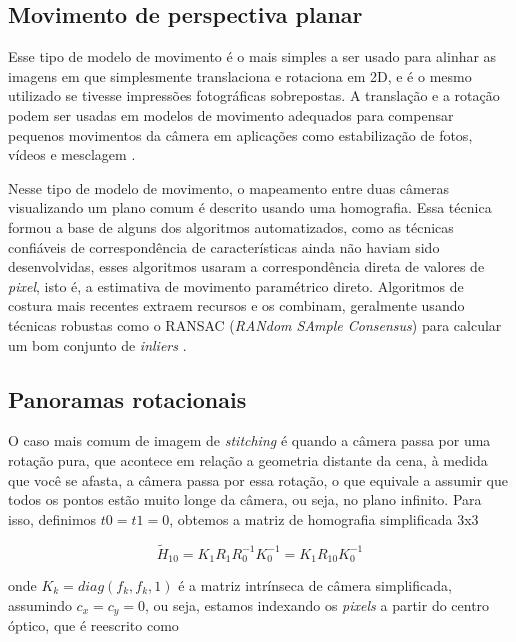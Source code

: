 \documentclass{article}
\begin{document}
\subsection{Movimento de perspectiva planar}
Esse tipo de modelo de movimento é o mais simples a ser usado para alinhar as imagens em que simplesmente translaciona e rotaciona em 2D, e é o mesmo utilizado se tivesse impressões fotográficas sobrepostas. A translação e a rotação podem ser usadas em modelos de movimento adequados para compensar pequenos movimentos da câmera em aplicações como estabilização de fotos, vídeos e mesclagem \cite{szeliski:2010}.

Nesse tipo de modelo de movimento, o mapeamento entre duas câmeras visualizando um plano comum é descrito usando uma homografia. Essa técnica formou a base de alguns dos algoritmos automatizados, como as técnicas confiáveis de correspondência de características ainda não haviam sido desenvolvidas, esses algoritmos usaram a correspondência direta de valores de \textit{pixel}, isto é, a estimativa de movimento paramétrico direto. Algoritmos de costura mais recentes extraem recursos e os combinam, geralmente usando técnicas robustas como o RANSAC (\textit{RANdom SAmple Consensus}) para calcular um bom conjunto de \textit{inliers} \cite{szeliski:2010}.

\subsection{Panoramas rotacionais}
O caso mais comum de imagem de \textit{stitching} é quando a câmera passa por uma rotação pura, que acontece em relação a geometria distante da cena, à medida que você se afasta, a câmera passa por essa rotação, o que equivale a assumir que todos os pontos estão muito longe da câmera, ou seja, no plano infinito. Para isso, definimos $t0 = t1 = 0$, obtemos a matriz de homografia simplificada 3x3

\begin{equation}
\tilde{H}_{10} = K_1R_1R^{-1}_0K^{-1}_0 = K_1R_{10}K^{-1}_0
\end{equation}

onde $K_k = diag(f_k, f_k, 1)$ é a matriz intrínseca de câmera simplificada, assumindo $c_x = c_y = 0$, ou seja, estamos indexando os \textit{pixels} a partir do centro óptico, que é reescrito como
\end{document}
